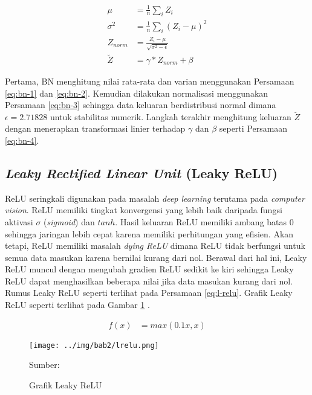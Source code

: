     \begin{align}
        \label{eq:bn-1}
        \mu &= \frac{1}{n} \sum_i Z_{i}\\
        \label{eq:bn-2}
        \sigma^2 &= \frac{1}{n} \sum_i (Z_{i}-\mu)^2\\
        \label{eq:bn-3}
        Z_{norm} &= \frac{Z_{i}-\mu}{\sqrt{\sigma^2-\epsilon}}\\
        \label{eq:bn-4}
        \breve{Z} &= \gamma \ast Z_{norm}+\beta
    \end{align}

    Pertama, BN menghitung nilai rata-rata dan varian menggunakan Persamaan \ref{eq:bn-1} dan \ref{eq:bn-2}. Kemudian dilakukan normalisasi menggunakan Persamaan \ref{eq:bn-3} sehingga data keluaran berdistribusi normal dimana $\epsilon = 2.71828$ untuk stabilitas numerik. Langkah terakhir menghitung keluaran $\breve{Z}$ dengan menerapkan transformasi linier terhadap $\gamma$ dan $\beta$ seperti Persamaan \ref{eq:bn-4}.

    \subsection{\textit{Leaky Rectified Linear Unit} (Leaky ReLU)}
    ReLU seringkali digunakan pada masalah \textit{deep learning} terutama pada \textit{computer vision}. ReLU memiliki tingkat konvergensi yang lebih baik daripada fungsi aktivasi $\sigma$ (\textit{sigmoid}) dan $tanh$. Hasil keluaran ReLU memiliki ambang batas $0$ sehingga jaringan lebih cepat karena memiliki perhitungan yang efisien. Akan tetapi, ReLU memiliki masalah \textit{dying ReLU} dimana ReLU tidak berfungsi untuk semua data masukan karena bernilai kurang dari nol. Berawal dari hal ini, Leaky ReLU muncul dengan mengubah gradien ReLU sedikit ke kiri sehingga Leaky ReLU dapat menghasilkan beberapa nilai jika data masukan kurang dari nol. Rumus Leaky ReLU seperti terlihat pada Persamaan \ref{eq:l-relu}. Grafik Leaky ReLU seperti terlihat pada Gambar \ref{fig:l-relu} \citep{Xu2015}.

    \begin{align}
        \label{eq:l-relu}
        f(x) &= max(0.1x, x)
    \end{align}

    \begin{figure}[H]
        \begin{center}
            \texttt{[image: ../img/bab2/lrelu.png]}
            \caption{Grafik Leaky ReLU}
            \label{fig:l-relu}
            Sumber: \citep{Xu2015}
        \end{center}
    \end{figure}

